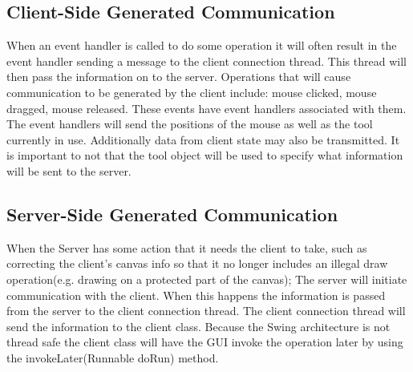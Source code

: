 \documentclass[12pt]{article}
\begin{document}
\subsection{Client-Side Generated Communication}
When an event handler is called to do some operation it will often result in the event handler sending a message to the client connection thread. This thread will then pass the information on to the server. 
Operations that will cause communication to be generated by the client include: 
mouse clicked, mouse dragged, mouse released.  These events have event handlers associated with them.  The event handlers will send the positions of the mouse as well as the tool currently in use. Additionally data from client state may also be transmitted.  It is important to not that the tool object will be used to specify what information will be sent to the server.


\subsection{Server-Side Generated Communication}
When the Server has some action that it needs the client to take, such as correcting the client's canvas info so that it no longer includes an illegal draw operation(e.g. drawing on a protected part of the canvas); The server will initiate communication with the client.  When this happens the information is passed from the server to the client connection thread.  The client connection thread will send the information to the client class.  Because the Swing architecture is not thread safe the client class will have the GUI invoke the operation later by using the invokeLater(Runnable doRun) method.
\end{document}
